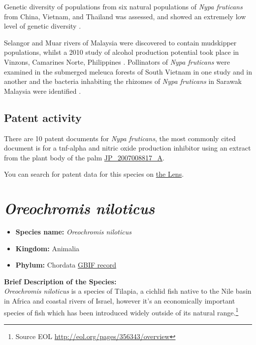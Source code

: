 \documentclass[]{book}
\providecommand{\tightlist}{%
  \setlength{\itemsep}{0pt}\setlength{\parskip}{0pt}}
\let\rmarkdownfootnote\footnote%
\def\footnote{\protect\rmarkdownfootnote}
\theoremstyle{definition}
\theoremstyle{definition}
\theoremstyle{definition}
\theoremstyle{remark}
\begin{document}
Genetic diversity of populations from six natural populations of
\emph{Nypa fruticans} from China, Vietnam, and Thailand was assessed,
and showed an extremely low level of genetic diversity
\citep{Jian_2010}.

Selangor and Muar rivers of Malaysia were discovered to contain
mudskipper populations, whilst a 2010 study of alcohol production
potential took place in Vinzons, Camarines Norte, Philippines
\citep{Rasco_2010}. Pollinators of \emph{Nypa fruticans} were examined
in the submerged meleuca forests of South Vietnam in one study and in
another and the bacteria inhabiting the rhizomes of \emph{Nypa
fruticans} in Sarawak Malaysia were identified
\citep{Quang_Tan_2008, Tang_2010}.

\hypertarget{patent-activity-4}{%
\subsection{Patent activity}\label{patent-activity-4}}

There are 10 patent documents for \emph{Nypa fruticans}, the most
commonly cited document is for a tnf-alpha and nitric oxide production
inhibitor using an extract from the plant body of the palm
\href{https://www.lens.org/lens/patent/JP_2007008817_A}{JP\_2007008817\_A}.

You can search for patent data for this species on
\href{https://www.lens.org/lens/search?q=title:(\%22Nypa\%20fruticans\%22)\%20OR\%20abstract:(\%22Nypa\%20fruticans\%22)\%20OR\%20claims:(\%22Nypa\%20fruticans\%22)\&l=en\&types=Patent\%20Application\&types=Granted\%20Patent\&preview=true}{the
Lens}.

\hypertarget{oreochromis-niloticus}{%
\section{\texorpdfstring{\emph{Oreochromis
niloticus}}{Oreochromis niloticus}}\label{oreochromis-niloticus}}

\begin{itemize}
\tightlist
\item
  \textbf{Species name:} \emph{Oreochromis niloticus}
\item
  \textbf{Kingdom:} Animalia\\
\item
  \textbf{Phylum:} Chordata
  \href{https://www.gbif.org/species/4285694}{GBIF record}
\end{itemize}

\textbf{Brief Description of the Species:}\\
\emph{Oreochromis niloticus} is a species of Tilapia, a cichlid fish
native to the Nile basin in Africa and coastal rivers of Israel, however
it's an economically important species of fish which has been introduced
widely outside of its natural range.\footnote{Source EOL
  \url{http://eol.org/pages/356343/overview}}
\end{document}
